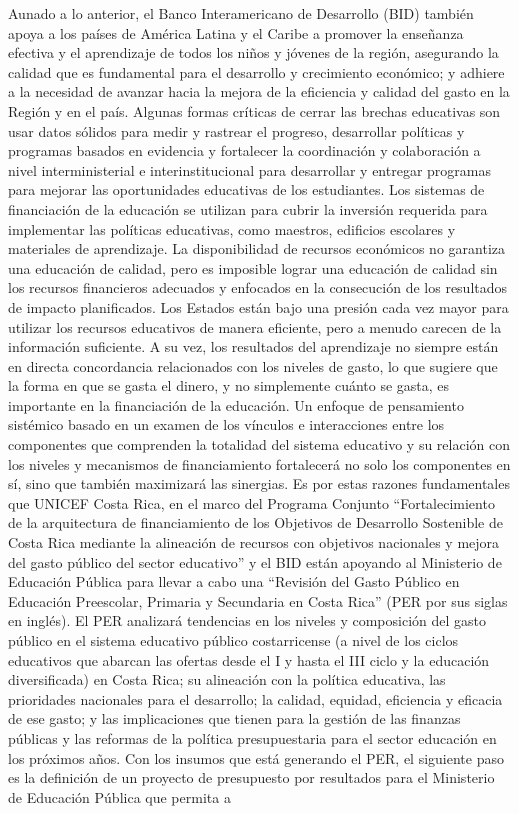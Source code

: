 \documentclass[a4paper, 9pt, conference]{article}              %
\theoremstyle{definition}
\begin{document}
Aunado a lo anterior, el Banco Interamericano de Desarrollo (BID) tambi\'en apoya a los pa\'ises de Am\'erica Latina y el Caribe a promover la ense\~nanza efectiva y el aprendizaje de todos los ni\~nos y j\'ovenes de la regi\'on, asegurando la calidad que es fundamental para el desarrollo y crecimiento econ\'omico; y adhiere a la necesidad de avanzar hacia la mejora de la eficiencia y calidad del gasto en la Regi\'on y en el pa\'is. Algunas formas cr\'iticas de cerrar las brechas educativas son usar datos s\'olidos para medir y rastrear el progreso, desarrollar pol\'iticas y programas basados en evidencia y fortalecer la coordinaci\'on y colaboraci\'on a nivel interministerial e interinstitucional para desarrollar y entregar programas para mejorar las oportunidades educativas de los estudiantes. Los sistemas de financiaci\'on de la educaci\'on se utilizan para cubrir la inversi\'on requerida para implementar las pol\'iticas educativas, como maestros, edificios escolares y materiales de aprendizaje. La disponibilidad de recursos econ\'omicos no garantiza una educaci\'on de calidad, pero es imposible lograr una educaci\'on de calidad sin los recursos financieros adecuados y enfocados en la consecuci\'on de los resultados de impacto planificados. Los Estados est\'an bajo una presi\'on cada vez mayor para utilizar los recursos educativos de manera eficiente, pero a menudo carecen de la informaci\'on suficiente. A su vez, los resultados del aprendizaje no siempre est\'an en directa concordancia relacionados con los niveles de gasto, lo que sugiere que la forma en que se gasta el dinero, y no simplemente cu\'anto se gasta, es importante en la financiaci\'on de la educaci\'on. Un enfoque de pensamiento sist\'emico basado en un examen de los v\'inculos e interacciones entre los componentes que comprenden la totalidad del sistema educativo y su relaci\'on con los niveles y mecanismos de financiamiento fortalecer\'a no solo los componentes en s\'i, sino que tambi\'en maximizar\'a las sinergias. Es por estas razones fundamentales que UNICEF Costa Rica, en el marco del Programa Conjunto ``Fortalecimiento de la arquitectura de financiamiento de los Objetivos de Desarrollo Sostenible de Costa Rica mediante la alineaci\'on de recursos con objetivos nacionales y mejora del gasto p\'ublico del sector educativo'' y el BID est\'an apoyando al Ministerio de Educaci\'on P\'ublica para llevar a cabo una ``Revisi\'on del Gasto P\'ublico en Educaci\'on Preescolar, Primaria y Secundaria en Costa Rica'' (PER por sus siglas en ingl\'es). El PER analizar\'a tendencias en los niveles y composici\'on del gasto p\'ublico en el sistema educativo p\'ublico costarricense (a nivel de los ciclos educativos que abarcan las ofertas desde el I y hasta el III ciclo y la educaci\'on diversificada) en Costa Rica; su alineaci\'on con la pol\'itica educativa, las prioridades nacionales para el desarrollo; la calidad, equidad, eficiencia y eficacia de ese gasto; y las implicaciones que tienen para la gesti\'on de las finanzas p\'ublicas y las reformas de la pol\'itica presupuestaria para el sector educaci\'on en los pr\'oximos a\~nos. Con los insumos que est\'a generando el PER, el siguiente paso es la definici\'on de un proyecto de presupuesto por resultados para el Ministerio de Educaci\'on P\'ublica que permita a 
\end{document}
